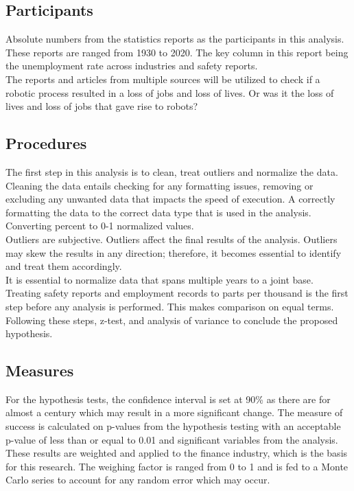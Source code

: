 \documentclass[
  english,
  man]{apa7}
\begin{document}
\hypertarget{participants}{%
\subsection{Participants}\label{participants}}

Absolute numbers from the statistics reports as the participants in this analysis. These reports are ranged from 1930 to 2020. The key column in this report being the unemployment rate across industries and safety reports.\\
The reports and articles from multiple sources will be utilized to check if a robotic process resulted in a loss of jobs and loss of lives. Or was it the loss of lives and loss of jobs that gave rise to robots?

\hypertarget{procedures}{%
\subsection{Procedures}\label{procedures}}

The first step in this analysis is to clean, treat outliers and normalize the data. Cleaning the data entails checking for any formatting issues, removing or excluding any unwanted data that impacts the speed of execution. A correctly formatting the data to the correct data type that is used in the analysis. Converting percent to 0-1 normalized values.\\
Outliers are subjective. Outliers affect the final results of the analysis. Outliers may skew the results in any direction; therefore, it becomes essential to identify and treat them accordingly.\\
It is essential to normalize data that spans multiple years to a joint base. Treating safety reports and employment records to parts per thousand is the first step before any analysis is performed. This makes comparison on equal terms.\\
Following these steps, z-test, and analysis of variance to conclude the proposed hypothesis.\\

\hypertarget{measures}{%
\subsection{Measures}\label{measures}}

For the hypothesis tests, the confidence interval is set at 90\% as there are for almost a century which may result in a more significant change. The measure of success is calculated on p-values from the hypothesis testing with an acceptable p-value of less than or equal to 0.01 and significant variables from the analysis.\\
These results are weighted and applied to the finance industry, which is the basis for this research. The weighing factor is ranged from 0 to 1 and is fed to a Monte Carlo series to account for any random error which may occur.
\end{document}

